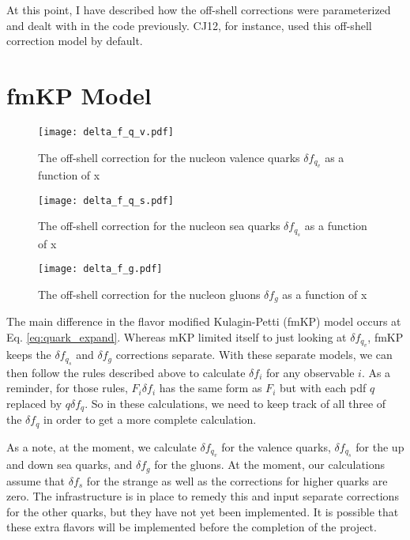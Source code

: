 \documentclass[12pt]{article}
\begin{document}
At this point, I have described how the off-shell corrections were parameterized and dealt with in the code previously.  CJ12, for instance, used this off-shell correction model by default.

\section{fmKP Model}

\begin{figure}[t]
\centering
\texttt{[image: delta\_f\_q\_v.pdf]}
\caption{The off-shell correction for the nucleon valence quarks $\delta f_{q_v}$ as a function of x}
\label{fig:f_qv}
\end{figure}
\begin{figure}[t]
\centering
\texttt{[image: delta\_f\_q\_s.pdf]}
\caption{The off-shell correction for the nucleon sea quarks $\delta f_{q_s}$ as a function of x}
\label{fig:f_qs}
\end{figure}
\begin{figure}[t]
\centering
\texttt{[image: delta\_f\_g.pdf]}
\caption{The off-shell correction for the nucleon gluons $\delta f_{g}$ as a function of x}
\label{fig:f_g}
\end{figure}

The main difference in the flavor modified Kulagin-Petti (fmKP) model occurs at Eq. \ref{eq:quark_expand}.  Whereas mKP limited itself to just looking at $\delta f_{q_v}$, fmKP keeps the $\delta f_{q_s}$ and $\delta f_g$ corrections separate.  With these separate models, we can then follow the rules described above to calculate $\delta f_i$ for any observable $i$.  As a reminder, for those rules, $F_i \delta f_i$ has the same form as $F_i$ but with each pdf $q$ replaced by $q\delta f_{q}$.  So in these calculations, we need to keep track of all three of the $\delta f_q$ in order to get a more complete calculation.

As a note, at the moment, we calculate $\delta f_{q_v}$ for the valence quarks, $\delta f_{q_s}$ for the up and down sea quarks, and $\delta f_g$ for the gluons.  At the moment, our calculations assume that $\delta f_s$ for the strange as well as the corrections for higher quarks are zero.  The infrastructure is in place to remedy this and input separate corrections for the other quarks, but they have not yet been implemented.  It is possible that these extra flavors will be implemented before the completion of the project.
\end{document}

